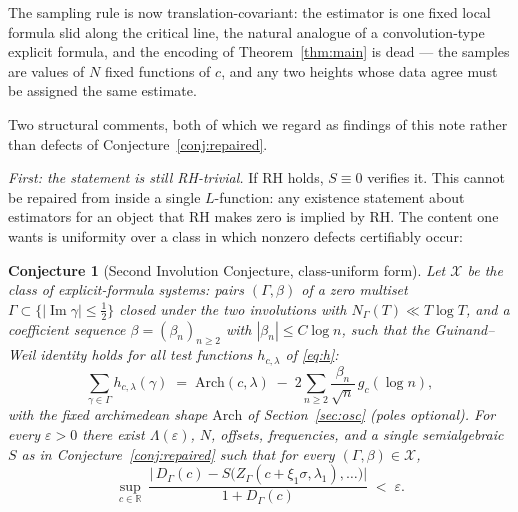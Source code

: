 \documentclass[11pt]{amsart}
\newtheorem{conjecture}[theorem]{Conjecture}
\theoremstyle{definition}
\theoremstyle{remark}
\newcommand{\RR}{\mathbb{R}}
\DeclareMathOperator{\Iim}{Im}
\begin{document}
The sampling rule is now translation-covariant: the estimator is one fixed local formula slid along the critical line, the natural analogue of a convolution-type explicit formula, and the encoding of Theorem~\ref{thm:main} is dead --- the samples are values of $N$ fixed functions of $c$, and any two heights whose data agree must be assigned the same estimate.

Two structural comments, both of which we regard as findings of this note rather than defects of Conjecture~\ref{conj:repaired}.

\emph{First: the statement is still RH-trivial.} If RH holds, $S\equiv0$ verifies it. This cannot be repaired from inside a single $L$-function: any existence statement about estimators for an object that RH makes zero is implied by RH. The content one wants is uniformity over a class in which nonzero defects certifiably occur:

\begin{conjecture}[Second Involution Conjecture, class-uniform form]\label{conj:uniform}
Let $\mathcal X$ be the class of \emph{explicit-formula systems}: pairs $(\Gamma,\beta)$ of a zero multiset $\Gamma\subset\{|\Iim\gamma|\le\tfrac12\}$ closed under the two involutions with $N_\Gamma(T)\ll T\log T$, and a coefficient sequence $\beta=(\beta_n)_{n\ge2}$ with $|\beta_n|\le C\log n$, such that the Guinand--Weil identity holds for all test functions $h_{c,\lambda}$ of \eqref{eq:h}:
\[
\sum_{\gamma\in\Gamma}h_{c,\lambda}(\gamma)\;=\;\mathrm{Arch}(c,\lambda)\;-\;2\sum_{n\ge2}\frac{\beta_n}{\sqrt n}\,g_c(\log n),
\]
with the fixed archimedean shape $\mathrm{Arch}$ of Section~\ref{sec:osc} (poles optional). For every $\varepsilon>0$ there exist $\Lambda(\varepsilon)$, $N$, offsets, frequencies, and a single semialgebraic $S$ as in Conjecture~\ref{conj:repaired} such that for \emph{every} $(\Gamma,\beta)\in\mathcal X$,
\[
\sup_{c\in\RR}\ \frac{\big|\,D_\Gamma(c)-S\big(Z_\Gamma(c+\xi_1\sigma,\lambda_1),\dots\big)\big|}{1+D_\Gamma(c)}\;<\;\varepsilon .
\]
\end{conjecture}
\end{document}
